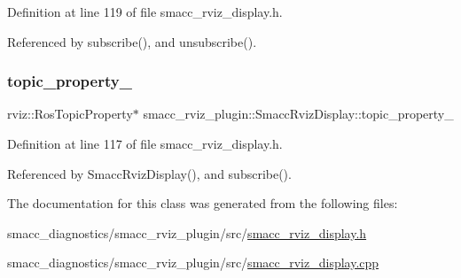 Definition at line 119 of file smacc\+\_\+rviz\+\_\+display.\+h.



Referenced by subscribe(), and unsubscribe().

\mbox{\label{classsmacc__rviz__plugin_1_1SmaccRvizDisplay_ad81e5239e1343b2ba01ee16d1f010932}} 
\subsubsection{\texorpdfstring{topic\+\_\+property\+\_\+}{topic\_property\_}}
{\footnotesize\ttfamily rviz\+::\+Ros\+Topic\+Property$\ast$ smacc\+\_\+rviz\+\_\+plugin\+::\+Smacc\+Rviz\+Display\+::topic\+\_\+property\+\_\+\hspace{0.3cm}{\ttfamily [private]}}



Definition at line 117 of file smacc\+\_\+rviz\+\_\+display.\+h.



Referenced by Smacc\+Rviz\+Display(), and subscribe().



The documentation for this class was generated from the following files\+:\begin{DoxyCompactItemize}
\item 
smacc\+\_\+diagnostics/smacc\+\_\+rviz\+\_\+plugin/src/\hyperlink{smacc__rviz__display_8h}{smacc\+\_\+rviz\+\_\+display.\+h}\item 
smacc\+\_\+diagnostics/smacc\+\_\+rviz\+\_\+plugin/src/\hyperlink{smacc__rviz__display_8cpp}{smacc\+\_\+rviz\+\_\+display.\+cpp}\end{DoxyCompactItemize}
